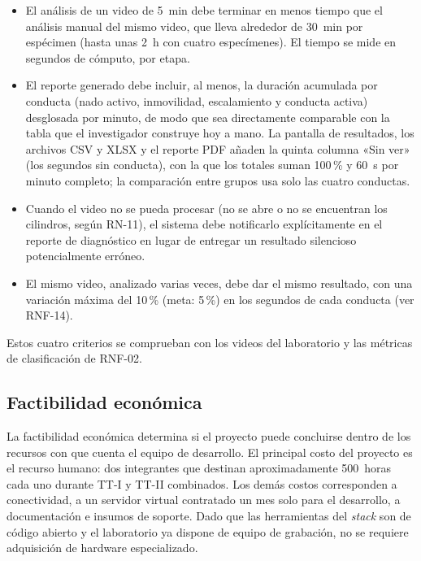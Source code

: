 \begin{itemize}
  \item El análisis de un video de 5~min debe terminar en menos tiempo que el
        análisis manual del mismo video, que lleva alrededor de 30~min por
        espécimen (hasta unas 2~h con cuatro especímenes). El tiempo se mide en
        segundos de cómputo, por etapa.
  \item El reporte generado debe incluir, al menos, la duración acumulada por conducta
        (nado activo, inmovilidad, escalamiento y conducta activa) desglosada por
        minuto, de modo que sea directamente comparable con la tabla que el
        investigador construye hoy a mano. La pantalla de resultados, los archivos
        CSV y XLSX y el reporte PDF añaden la quinta columna «Sin ver» (los segundos sin conducta),
        con la que los totales suman 100\,\% y 60~s por minuto completo; la comparación
        entre grupos usa solo las cuatro conductas.
  \item Cuando el video no se pueda procesar (no se abre o no se encuentran los
        cilindros, según RN-11), el sistema debe notificarlo explícitamente en el
        reporte de diagnóstico en lugar de entregar un resultado silencioso
        potencialmente erróneo.
  \item El mismo video, analizado varias veces, debe dar el mismo resultado, con una
        variación máxima del 10\,\% (meta: 5\,\%) en los segundos de cada conducta
        (ver RNF-14).
\end{itemize}

Estos cuatro criterios se comprueban con los videos del laboratorio y las métricas de clasificación de RNF-02.

\subsection{Factibilidad económica}

La factibilidad económica determina si el proyecto puede concluirse dentro de los
recursos con que cuenta el equipo de desarrollo. El principal costo del proyecto es
el recurso humano: dos integrantes que destinan aproximadamente 500~horas cada uno
durante TT-I y TT-II combinados. Los demás costos corresponden a conectividad,
a un servidor virtual contratado un mes solo para el desarrollo, a documentación e insumos de soporte. Dado que las herramientas del
\textit{stack} son de código abierto y el laboratorio ya dispone de equipo de
grabación, no se requiere adquisición de hardware especializado.

